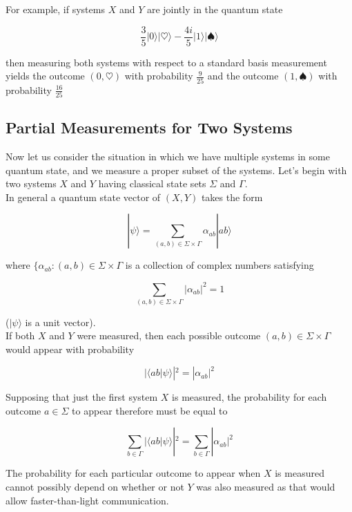 \documentclass[svgnames]{article}     %
\begin{document}
For example, if systems $X$ and $Y$ are jointly in the quantum state

\[
\frac{3}{5}|0\rangle |\heartsuit\rangle - \frac{4i}{5}|1\rangle |\spadesuit\rangle  
\] \vspace{5px}

then measuring both systems with respect to a standard basis measurement yields the outcome $(0, \heartsuit)$ with probability $\frac{9}{25}$ and the outcome $(1, \spadesuit)$ with probability $\frac{16}{25}$


\subsection{Partial Measurements for Two Systems}

Now let us consider the situation in which we have multiple systems in some quantum state, and we measure a proper subset of the systems. Let's begin with two systems $X$ and $Y$ having classical state sets $\Sigma$ and $\Gamma$. \\

In general a quantum state vector of $(X, Y)$ takes the form 

\[
  |\psi\rangle = \sum_{(a,b)\in\Sigma\times\Gamma} \alpha_{ab}|ab\rangle 
\] \vspace{5px}

where $\{ \alpha_{ab}: (a, b) \in \Sigma\times\Gamma$ is a collection of complex numbers satisfying 

  \[
    \sum_{(a,b) \in \Sigma\times\Gamma} |\alpha_{ab}|^2 = 1
  \] \vspace{5px}
  
($|\psi\rangle $ is a unit vector).\\

If both $X$ and $Y$ were measured, then each possible outcome $(a, b) \in \Sigma\times\Gamma$ would appear with probability 

\[
  |\langle ab | \psi \rangle |^2 = |\alpha_{ab}|^2
\] \vspace{5px}

Supposing that just the first system $X$ is measured, the probability for each outcome $a\in\Sigma$ to appear therefore must be equal to 

\[
  \sum_{b\in\Gamma} |\langle ab | \psi \rangle |^2 = \sum_{b\in\Gamma}|\alpha_{ab}|^2
\] \vspace{5px}

The probability  for each particular outcome to appear when $X$ is measured cannot possibly depend on whether or not $Y$ was also measured as that would allow faster-than-light communication. \\
\end{document}

